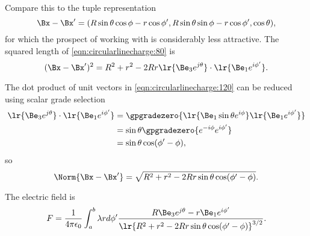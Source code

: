 Compare this to the tuple representation
\begin{equation}\label{eqn:circularlinecharge:100}
\Bx - \Bx'
= ( R \sin\theta \cos\phi - r \cos\phi', R \sin\theta \sin\phi - r \cos\phi', \cos\theta ),
\end{equation}
for which the prospect of working with is considerably less attractive.
The squared length of \cref{eqn:circularlinecharge:80} is
\begin{equation}\label{eqn:circularlinecharge:120}
(\Bx - \Bx')^2
=
R^2 + r^2 - 2 R r \lr{\Be_3 e^{j \theta} } \cdot \lr{ \Be_1 e^{i \phi'} }.
\end{equation}

The dot product of unit vectors in \cref{eqn:circularlinecharge:120} can be reduced using scalar grade selection
\begin{equation}\label{eqn:circularlinecharge:140}
\begin{aligned}
\lr{\Be_3 e^{j \theta }} \cdot \lr{ \Be_1 e^{i \phi'} }
&=
\gpgradezero{
\lr{ \Be_1 \sin\theta e^{i \phi} } \lr{ \Be_1 e^{i \phi'}}
} \\
&=
\sin\theta
\gpgradezero{
e^{-i \phi} e^{i \phi'}
} \\
&=
\sin\theta \cos( \phi' - \phi ),
\end{aligned}
\end{equation}
so
\begin{equation}\label{eqn:circularlinecharge:160}
\Norm{ \Bx - \Bx' }
=
\sqrt{
R^2 + r^2 - 2 R r \sin\theta \cos( \phi' - \phi )
}.
\end{equation}

The electric field is
\begin{equation}\label{eqn:circularlinecharge:180}
F = \frac{1}{4 \pi \epsilon_0} \int_a^b \lambda r d\phi' \frac{ R \Be_3 e^{j \theta } - r \Be_1 e^{i \phi'} }{\lr{ R^2 + r^2 - 2 R r \sin\theta \cos( \phi' - \phi ) }^{3/2} }.
\end{equation}

